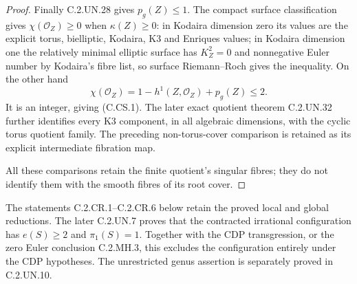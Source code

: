 \begin{proof}
Finally C.2.UN.28 gives $p_g(Z)\le1$.
The compact surface classification
gives $\chi(\mathcal O_Z)\ge0$ when
$\kappa(Z)\ge0$: in Kodaira dimension
zero its values are the explicit
torus, bielliptic, Kodaira, K3 and
Enriques values; in Kodaira dimension
one the relatively minimal elliptic
surface has $K_Z^2=0$ and nonnegative
Euler number by Kodaira's fibre list,
so surface Riemann--Roch gives the
inequality. On the other hand
\[
        \chi(\mathcal O_Z)=1-h^1(Z,\mathcal O_Z)+p_g(Z)
                              \le2.
                                                               \tag{C.CS.6}
\]
It is an integer, giving (C.CS.1).
The later exact quotient theorem
C.2.UN.32 further identifies every K3
component, in all algebraic dimensions,
with the cyclic torus quotient family.
The preceding non-torus-cover comparison
is retained as its explicit intermediate
fibration map.

All these comparisons retain the
finite quotient's singular fibres;
they do not identify them with the
smooth fibres of its root cover.
\end{proof}



The statements C.2.CR.1--C.2.CR.6 below retain the
proved local and global reductions. The later
C.2.UN.7 proves that the contracted irrational
configuration has $e(S)\ge2$ and $\pi_1(S)=1$.
Together with the CDP transgression, or the zero
Euler conclusion C.2.MH.3, this excludes the
configuration entirely under the CDP hypotheses.
The unrestricted genus assertion is separately
proved in C.2.UN.10.

